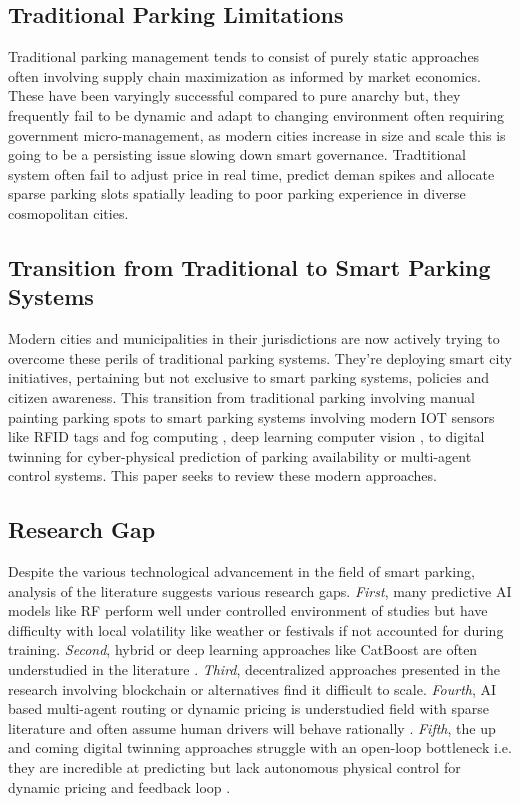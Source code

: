 \documentclass[conference]{IEEEtran}
\begin{document}
\subsection{Traditional Parking Limitations}
Traditional parking management tends to consist of purely static approaches often involving supply chain maximization as informed by market economics. These have been varyingly successful compared to pure anarchy but, they frequently fail to be dynamic and adapt to changing environment often requiring government micro-management, as modern cities increase in size and scale this is going to be a persisting issue slowing down smart governance. Tradtitional system often fail to adjust price in real time, predict deman spikes and allocate sparse parking slots spatially leading to poor parking experience in diverse cosmopolitan cities\cite{b15}.

\subsection{Transition from Traditional to Smart Parking Systems}
Modern cities and municipalities in their jurisdictions are now actively trying to overcome these perils of traditional parking systems. They're deploying smart city initiatives, pertaining but not exclusive to smart parking systems, policies and citizen awareness. This transition from traditional parking involving manual painting parking spots to smart parking systems involving modern IOT sensors like RFID tags and fog computing \cite{b35}, deep learning computer vision \cite{b32}, to digital twinning for cyber-physical prediction of parking availability or multi-agent control systems\cite{b23}. This paper seeks to review these modern approaches.

\subsection{Research Gap}
Despite the various technological advancement in the field of smart parking, analysis of the literature suggests various research gaps. \textit{First}, many predictive AI models like RF perform well under controlled environment of studies but have difficulty with local volatility like weather or festivals if not accounted for during training\cite{b29}. \textit{Second}, hybrid or deep learning approaches like CatBoost are often understudied in the literature \cite{b32}. \textit{Third}, decentralized approaches presented in the research involving blockchain or alternatives find it difficult to scale\cite{b27}. \textit{Fourth}, AI based multi-agent routing or dynamic pricing is understudied field with sparse literature and often assume human drivers will behave rationally \cite{b23}. \textit{Fifth}, the up and coming digital twinning approaches struggle with an open-loop bottleneck i.e. they are incredible at predicting but lack autonomous physical control for dynamic pricing and feedback loop \cite{b1}. 
\end{document}
